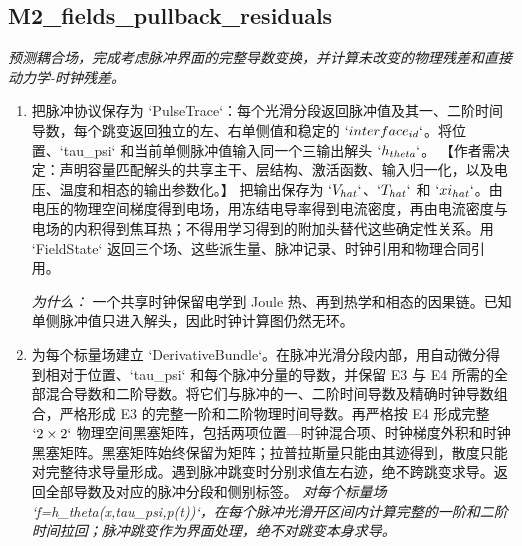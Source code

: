 \documentclass[10pt,a4paper]{article}
\begin{document}
\subsection*{M2\_fields\_pullback\_residuals}
\emph{预测耦合场，完成考虑脉冲界面的完整导数变换，并计算未改变的物理残差和直接动力学-时钟残差。}
\begin{enumerate}[leftmargin=*,start=3]
  \item 把脉冲协议保存为 `PulseTrace`：每个光滑分段返回脉冲值及其一、二阶时间导数，每个跳变返回独立的左、右单侧值和稳定的 \(`interface_{id}`\)。将位置、`tau\_psi` 和当前单侧脉冲值输入同一个三输出解头 \(`h_{theta}`\)。 【作者需决定：声明容量匹配解头的共享主干、层结构、激活函数、输入归一化，以及电压、温度和相态的输出参数化。】 把输出保存为 \(`V_{hat}`\)、\(`T_{hat}`\) 和 \(`xi_{hat}`\)。由电压的物理空间梯度得到电场，用冻结电导率得到电流密度，再由电流密度与电场的内积得到焦耳热；不得用学习得到的附加头替代这些确定性关系。用 `FieldState` 返回三个场、这些派生量、脉冲记录、时钟引用和物理合同引用。
\par\emph{为什么：} 一个共享时钟保留电学到 Joule 热、再到热学和相态的因果链。已知单侧脉冲值只进入解头，因此时钟计算图仍然无环。
  \item 为每个标量场建立 `DerivativeBundle`。在脉冲光滑分段内部，用自动微分得到相对于位置、`tau\_psi` 和每个脉冲分量的导数，并保留 E3 与 E4 所需的全部混合导数和二阶导数。将它们与脉冲的一、二阶时间导数及精确时钟导数组合，严格形成 E3 的完整一阶和二阶物理时间导数。再严格按 E4 形成完整 \(`2\times 2`\) 物理空间黑塞矩阵，包括两项位置---时钟混合项、时钟梯度外积和时钟黑塞矩阵。黑塞矩阵始终保留为矩阵；拉普拉斯量只能由其迹得到，散度只能对完整待求导量形成。遇到脉冲跳变时分别求值左右迹，绝不跨跳变求导。返回全部导数及对应的脉冲分段和侧别标签。
\noindent\emph{对每个标量场 `f=h\_theta(x,tau\_psi,p(t))`，在每个脉冲光滑开区间内计算完整的一阶和二阶时间拉回；脉冲跳变作为界面处理，绝不对跳变本身求导。}
\par{}

\end{enumerate}
\end{document}
